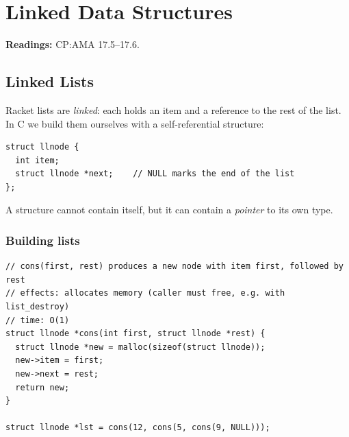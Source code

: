 \chapter{Linked Data Structures}

\textbf{Readings:} CP:AMA 17.5--17.6.


\section{Linked Lists}

Racket lists are \emph{linked}: each  holds an item and a reference to the rest of
the list. In C we build them ourselves with a self-referential structure:
\begin{lstlisting}[style=c]
struct llnode {
  int item;
  struct llnode *next;    // NULL marks the end of the list
};
\end{lstlisting}
A structure cannot contain itself, but it can contain a \emph{pointer} to its own type.
\begin{center}
\end{center}

\subsection{Building lists}
\begin{lstlisting}[style=c]
// cons(first, rest) produces a new node with item first, followed by rest
// effects: allocates memory (caller must free, e.g. with list_destroy)
// time: O(1)
struct llnode *cons(int first, struct llnode *rest) {
  struct llnode *new = malloc(sizeof(struct llnode));
  new->item = first;
  new->next = rest;
  return new;
}

struct llnode *lst = cons(12, cons(5, cons(9, NULL)));
\end{lstlisting}

